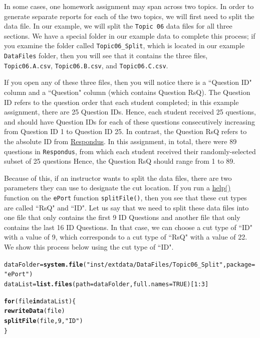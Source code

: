 \documentclass{article}\usepackage[]{graphicx}\usepackage[]{color}
\makeatletter
\newcommand{\hlnum}[1]{\textcolor[rgb]{0.686,0.059,0.569}{#1}}%
\newcommand{\hlstr}[1]{\textcolor[rgb]{0.192,0.494,0.8}{#1}}%
\newcommand{\hlopt}[1]{\textcolor[rgb]{0,0,0}{#1}}%
\newcommand{\hlstd}[1]{\textcolor[rgb]{0.345,0.345,0.345}{#1}}%
\newcommand{\hlkwa}[1]{\textcolor[rgb]{0.161,0.373,0.58}{\textbf{#1}}}%
\newcommand{\hlkwb}[1]{\textcolor[rgb]{0.69,0.353,0.396}{#1}}%
\newcommand{\hlkwc}[1]{\textcolor[rgb]{0.333,0.667,0.333}{#1}}%
\newcommand{\hlkwd}[1]{\textcolor[rgb]{0.737,0.353,0.396}{\textbf{#1}}}%
\newenvironment{kframe}{%
 \def\at@end@of@kframe{}%
 \ifinner\ifhmode%
  \def\at@end@of@kframe{\end{minipage}}%
  \begin{minipage}{\columnwidth}%
 \fi\fi%
 \def\FrameCommand##1{\hskip\@totalleftmargin \hskip-\fboxsep
 \colorbox{shadecolor}{##1}\hskip-\fboxsep
     \hskip-\linewidth \hskip-\@totalleftmargin \hskip\columnwidth}%
 \MakeFramed {\advance\hsize-\width
   \@totalleftmargin\z@ \linewidth\hsize
   \@setminipage}}%
 {\par\unskip\endMakeFramed%
 \at@end@of@kframe}
\newenvironment{knitrout}{}{} %
\numberwithin{equation}{section} %
\makeatother
\begin{document}
In some cases, one homework assignment may span across two topics. In order to generate separate reports for each of the two topics, we will first need to split the data file. In our example, we will split the \texttt{Topic 06} data files for all three sections. We have a special folder in our example data to complete this process; if you examine the folder called \texttt{Topic06\_Split}, which is located in our example \texttt{DataFiles} folder, then you will see that it contains the three files, \texttt{Topic06.A.csv}, \texttt{Topic06.B.csv}, and \texttt{Topic06.C.csv}.

If you open any of these three files, then you will notice there is a ``Question ID" column and a ``Question" column (which contains Question RsQ). The Question ID refers to the question order that each student completed; in this example assignment, there are 25 Question IDs. Hence, each student received 25 questions, and should have Question IDs for each of these questions consecutively increasing from Question ID 1 to Question ID 25. In contrast, the Question RsQ refers to the absolute ID from \hyperref[sec:ResSection]{Respondus}. In this assignment, in total, there were 89 questions in \texttt{Respondus}, from which each student received their randomly-selected subset of 25 questions Hence, the Question RsQ should range from 1 to 89.

Because of this, if an instructor wants to split the data files, there are two parameters they can use to designate the cut location. If you run a \hyperref[sec:helpSection]{help()} function on the \texttt{ePort} function \texttt{splitFile()}, then you see that these cut types are called ``RsQ" and ``ID". Let us say that we need to split these data files into one file that only contains the first 9 ID Questions and another file that only contains the last 16 ID Questions. In that case, we can choose a cut type of ``ID" with a value of 9, which corresponds to a cut type of ``RsQ" with a value of 22. We show this process below using the cut type of ``ID". \\

\begin{knitrout}
\color{fgcolor}\begin{kframe}
\begin{alltt}
\hlstd{dataFolder} \hlkwb{=} \hlkwd{system.file}\hlstd{(}\hlstr{"inst/extdata/DataFiles/Topic06_Split"}\hlstd{,} \hlkwc{package} \hlstd{=} \hlstr{"ePort"}\hlstd{)}
\hlstd{dataList} \hlkwb{=} \hlkwd{list.files}\hlstd{(}\hlkwc{path} \hlstd{= dataFolder,} \hlkwc{full.names} \hlstd{=} \hlnum{TRUE}\hlstd{)[}\hlnum{1}\hlopt{:}\hlnum{3}\hlstd{]}

\hlkwa{for}\hlstd{(file} \hlkwa{in} \hlstd{dataList)\{}
  \hlkwd{rewriteData}\hlstd{(file)}
  \hlkwd{splitFile}\hlstd{(file,} \hlnum{9}\hlstd{,} \hlstr{"ID"}\hlstd{)}
\hlstd{\}}
\end{alltt}
\end{kframe}
\end{knitrout}
\end{document}
